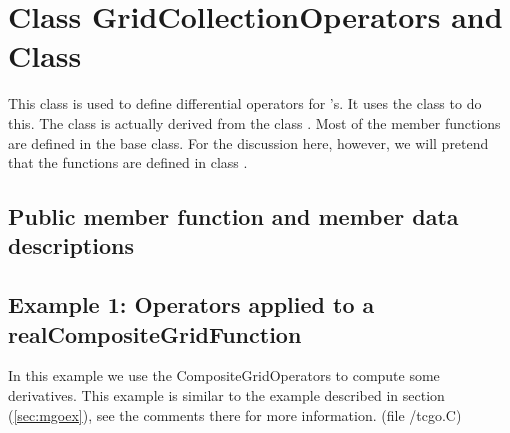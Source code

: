 \section{Class GridCollectionOperators and Class \CGO}

This class is used to define differential operators for {\ff \RCGF}'s.
It uses the {\ff \MGO} class to do this. The class {\ff \CGO} is 
actually derived from the class {\ff \GCO}. Most of the member
functions are defined in the base class. For the discussion here,
however, we will pretend that the functions are defined in 
class {\ff \CGO}.

\subsection{Public member function and member data descriptions}




\vfill\eject
\subsection{Example 1: Operators applied to a {\ff realCompositeGridFunction}} \label{sec:cgoex}

In this example we use the CompositeGridOperators to compute some derivatives.
This example is similar to the example described in section (\ref{sec:mgoex}),
see the comments there for more information.
(file {\ff \examples /tcgo.C})
{\footnotesize
{}
}

